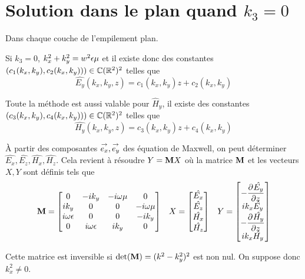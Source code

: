 \section[Solution dans le plan quand k3 = 0]{Solution dans le plan quand \(k_3 = 0\)}
  \label{sec:annexe:plan:k3_nul}

  Dans chaque couche de l'empilement plan.

  Si \(k_3 = 0\), \(k_x^2 + k_y^2 = w^2\eps\mu\) et il existe donc des constantes \((c_1(k_x,k_y),c_2(k_x,k_y))) \in \CC(\RR^2)^2\) telles que
  \begin{equation*}
    \hat{E_y}(k_x,k_y,z) = c_1(k_x,k_y) z + c_2(k_x,k_y)
  \end{equation*}

  Toute la méthode est aussi valable pour \(\hat H_y\), il existe des constantes \((c_3(k_x,k_y),c_4(k_x,k_y))) \in \CC(\RR^2)^2\) telles que
  \begin{equation*}
    \hat{H_y}(k_x,k_y,z) = c_3(k_x,k_y) z + c_4(k_x,k_y)
  \end{equation*}

  À partir des composantes \(\vect{e_x},\vect{e_y}\) des équation de Maxwell, on peut déterminer \(\hat{E_x},\hat{E_z},\hat{H_x},\hat{H_z}\).
  Cela revient à résoudre \(Y = \mM X\) où la matrice \(\mM\) et les vecteurs \(X, Y\) sont définis tels que
  \begin{align*}
    \mM =
    \begin{bmatrix}
    0 & -ik_y & -i\w\mu & 0
    \\
    ik_y & 0 & 0 & -i\w\mu
    \\
    i\w\eps & 0 & 0 & -ik_y
    \\
    0 & i\w\eps & ik_y & 0
    \end{bmatrix}
    &&
    X =
    \begin{bmatrix}
      \hat{E_x}\\
      \hat{E_z}\\
      \hat{H_x}\\
      \hat{H_z}
    \end{bmatrix}
    &&
    Y =
    \begin{bmatrix}
      -\ddr{z}{\hat{E_y}}\\
      ik_x\hat{E_y}\\
      -\ddr{z}{\hat{H_y}}\\
      ik_x\hat{H_y}
    \end{bmatrix}
  \end{align*}

  Cette matrice est inversible si \(\det(\mM) = (k^2 - k_y^2)^2 \) est non nul. On suppose donc \(k_x^2\not=0\).

